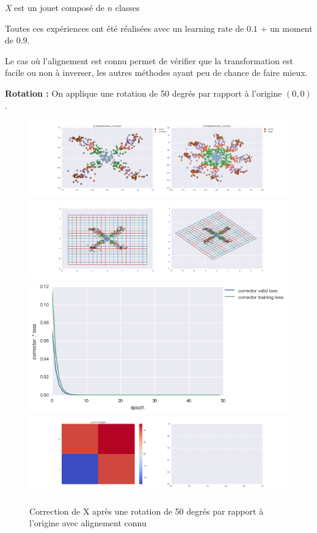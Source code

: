 

\emph{X} est un jouet composé de $n$ classes 

Toutes ces expériences ont été réalisées avec un learning rate de $0.1$ + un moment de $0.9$.

Le cas où l'alignement est connu permet de vérifier que la transformation est facile ou non 
à inverser, les autres méthodes ayant peu de chance de faire mieux.

{\Large \textbf{Rotation :}} On applique une rotation de 50 degrés par rapport à l'origine $(0,0)$.

\begin{figure}[H] %
\centering
\includegraphics[width=\linewidth]{fig/24-05-2016/X/X_RotatedPairwise_Corrector-DATA.png}
\includegraphics[width=\linewidth]{fig/24-05-2016/X/X_RotatedPairwise_Corrector-GridCheck.png}
\includegraphics[width=0.45\linewidth]{fig/24-05-2016/X/X_RotatedPairwise_Corrector-Learning_curve.png}
\includegraphics[width=\linewidth]{fig/24-05-2016/X/X_RotatedPairwise_Corrector-W.png}
\caption{Correction de X après une rotation de 50 degrés par rapport à l'origine avec alignement connu}
\label{fig:recap-X-rot-pairwise}
\end{figure}


